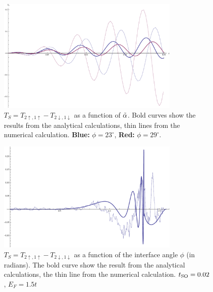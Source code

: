 \begin{figure}
    \begin{center}
        \includegraphics[width=0.8\textwidth]{comparison-over-alpha.pdf}
    \end{center}
    \caption{$T_S = T_{2\uparrow,1\uparrow} - T_{2\downarrow,1\downarrow}$ as
        a function of $\tilde \alpha$. Bold curves show the results from the analytical
        calculations, thin lines from the numerical calculation.
        \textbf{Blue:} $\phi = 23^\circ$, \textbf{Red:} $\phi = 29^\circ$.
    }
    \label{fig:a-n-matching-alpha}
\end{figure}
\begin{figure}
    \begin{center}
        \includegraphics[width=0.8\textwidth]{comparison-over-phi.pdf}
    \end{center}
    \caption{$T_S = T_{2\uparrow,1\uparrow} - T_{2\downarrow,1\downarrow}$ as
        a function of the interface angle $\phi$ (in radians). The bold curve
            show the result from the analytical calculations, the thin line
            from the numerical calculation. $t_{\textnormal{SO}} = 0.02$, $E_F = 1.5t$
    }
    \label{fig:a-n-matching-phi}
\end{figure}
